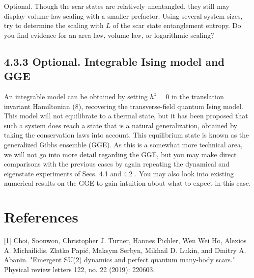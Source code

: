\documentclass[12pt]{article}
\begin{document}
Optional. Though the scar states are relatively unentangled, they still may display volume-law scaling with a smaller prefactor. Using several system sizes, try to determine the scaling with $L$ of the scar state entanglement entropy. Do you find evidence for an area law, volume law, or logarithmic scaling?

\subsection*{4.3.3 Optional. Integrable Ising model and GGE}
An integrable model can be obtained by setting $h^{z}=0$ in the translation invariant Hamiltonian (8), recovering the transverse-field quantum Ising model. This model will not equilibrate to a thermal state, but it has been proposed that such a system does reach a state that is a natural generalization, obtained by taking the conservation laws into account. This equilibrium state is known as the generalized Gibbs ensemble (GGE). As this is a somewhat more technical area, we will not go into more detail regarding the GGE, but you may make direct comparisons with the previous cases by again repeating the dynamical and eigenstate experiments of Secs. 4.1 and 4.2 . You may also look into existing numerical results on the GGE to gain intuition about what to expect in this case.

\section*{References}
[1] Choi, Soonwon, Christopher J. Turner, Hannes Pichler, Wen Wei Ho, Alexios A. Michailidis, Zlatko Papić, Maksym Serbyn, Mikhail D. Lukin, and Dmitry A. Abanin. "Emergent SU(2) dynamics and perfect quantum many-body scars." Physical review letters 122, no. 22 (2019): 220603.
\end{document}
